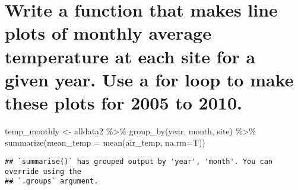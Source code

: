 \documentclass[
]{book}
\newenvironment{Shaded}{\begin{snugshade}}{\end{snugshade}}
\newcommand{\AttributeTok}[1]{\textcolor[rgb]{0.77,0.63,0.00}{#1}}
\newcommand{\FunctionTok}[1]{\textcolor[rgb]{0.00,0.00,0.00}{#1}}
\newcommand{\NormalTok}[1]{#1}
\newcommand{\OtherTok}[1]{\textcolor[rgb]{0.56,0.35,0.01}{#1}}
\newcommand{\SpecialCharTok}[1]{\textcolor[rgb]{0.00,0.00,0.00}{#1}}
\newcommand{\StringTok}[1]{\textcolor[rgb]{0.31,0.60,0.02}{#1}}
\begin{document}
\hypertarget{write-a-function-that-makes-line-plots-of-monthly-average-temperature-at-each-site-for-a-given-year.-use-a-for-loop-to-make-these-plots-for-2005-to-2010.}{%
\section{Write a function that makes line plots of monthly average temperature at each site for a given year. Use a for loop to make these plots for 2005 to 2010.}\label{write-a-function-that-makes-line-plots-of-monthly-average-temperature-at-each-site-for-a-given-year.-use-a-for-loop-to-make-these-plots-for-2005-to-2010.}}

\begin{Shaded}
\begin{Highlighting}[]
\NormalTok{temp\_monthly }\OtherTok{\textless{}{-}}\NormalTok{ alldata2 }\SpecialCharTok{\%\textgreater{}\%}
    \FunctionTok{group\_by}\NormalTok{(year, month, site) }\SpecialCharTok{\%\textgreater{}\%}
    \FunctionTok{summarize}\NormalTok{(}\AttributeTok{mean\_temp =} \FunctionTok{mean}\NormalTok{(}\StringTok{\textasciigrave{}}\AttributeTok{air\_temp}\StringTok{\textasciigrave{}}\NormalTok{, }\AttributeTok{na.rm=}\NormalTok{T))}
\end{Highlighting}
\end{Shaded}

\begin{verbatim}
## `summarise()` has grouped output by 'year', 'month'. You can override using the
## `.groups` argument.
\end{verbatim}
\end{document}
